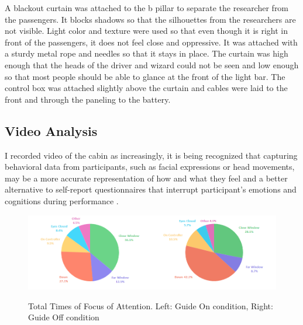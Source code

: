 A blackout curtain was attached to the b pillar to separate the researcher from the passengers. It blocks shadows so that the silhouettes from the researchers are not visible. Light color and texture were used so that even though it is right in front of the passengers, it does not feel close and oppressive. It was attached with a sturdy metal rope and needles so that it stays in place. The curtain was high enough that the heads of the driver and wizard could not be seen and low enough so that most people should be able to glance at the front of the light bar.  The control box was attached slightly above the curtain and cables were laid to the front and through the paneling to the battery. 

\subsection{Video Analysis}
\label{sec:videoAnalysis}

I recorded video of the cabin as increasingly, it is being recognized that capturing behavioral data from participants, such as facial expressions or head movements, may be a more accurate representation of how and what they feel and a better alternative to self-report questionnaires that interrupt participant’s emotions and cognitions during performance \cite{Ahn2011UsingPrediction}.

\begin{figure}
    \includegraphics[width=0.5\textwidth]{fig/PieTotal.png}\includegraphics[width=0.5\textwidth]{fig/PieTotalNo.png}
    \caption[Total Times of Focus of Attention]{Total Times of Focus of Attention. Left: Guide On condition, Right: Guide Off condition}
    \label{fig:totalPie}
\end{figure}

